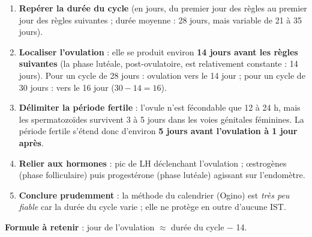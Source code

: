 \documentclass[11pt]{article}
\begin{document}
\begin{methode}
\begin{enumerate}
\item \textbf{Repérer la durée du cycle} (en jours, du premier jour des règles au premier jour des règles suivantes ; durée moyenne : 28 jours, mais variable de 21 à 35 jours).
\item \textbf{Localiser l'ovulation} : elle se produit environ \textbf{14 jours avant les règles suivantes} (la phase lutéale, post-ovulatoire, est relativement constante : 14 jours). Pour un cycle de 28 jours : ovulation vers le 14 jour ; pour un cycle de 30 jours : vers le 16 jour ($30 - 14 = 16$).
\item \textbf{Délimiter la période fertile} : l'ovule n'est fécondable que 12 à 24 h, mais les spermatozoïdes survivent 3 à 5 jours dans les voies génitales féminines. La période fertile s'étend donc d'environ \textbf{5 jours avant l'ovulation à 1 jour après}.
\item \textbf{Relier aux hormones} : pic de LH déclenchant l'ovulation ; œstrogènes (phase folliculaire) puis progestérone (phase lutéale) agissant sur l'endomètre.
\item \textbf{Conclure prudemment} : la méthode du calendrier (Ogino) est \emph{très peu fiable} car la durée du cycle varie ; elle ne protège en outre d'aucune IST.
\end{enumerate}
\textbf{Formule à retenir} : jour de l'ovulation $\approx$ durée du cycle $-$ 14.
\end{methode}
\end{document}

